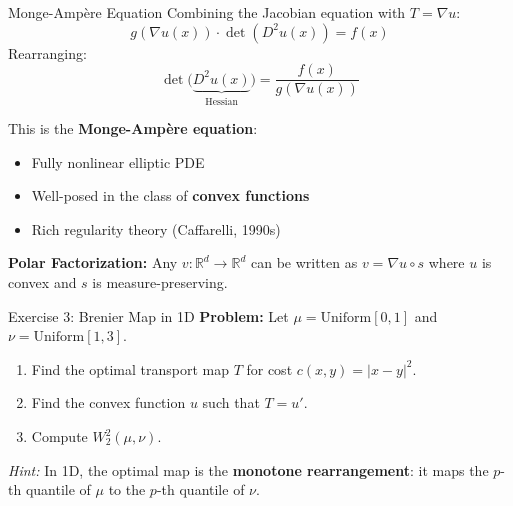 \documentclass[aspectratio=169]{beamer}
\newcommand{\R}{\mathbb{R}}
\begin{document}
\begin{frame}{Monge-Amp\`ere Equation}
Combining the Jacobian equation with $T = \nabla u$:
\[
g(\nabla u(x)) \cdot \det(D^2 u(x)) = f(x)
\]
Rearranging:
\[
\det\bigl(\underbrace{D^2 u(x)}_{\text{Hessian}}\bigr) = \frac{f(x)}{g(\nabla u(x))}
\]

\vspace{0.3cm}
This is the \textbf{Monge-Amp\`ere equation}:
\begin{itemize}
    \item Fully nonlinear elliptic PDE
    \item Well-posed in the class of \textbf{convex functions}
    \item Rich regularity theory (Caffarelli, 1990s)
\end{itemize}

\vspace{0.3cm}
\textbf{Polar Factorization:} Any $v: \R^d \to \R^d$ can be written as $v = \nabla u \circ s$ where $u$ is convex and $s$ is measure-preserving.
\end{frame}

\begin{frame}{Exercise 3: Brenier Map in 1D}
\textbf{Problem:} Let $\mu = \text{Uniform}[0,1]$ and $\nu = \text{Uniform}[1,3]$.

\vspace{0.3cm}
\begin{enumerate}
    \item[(a)] Find the optimal transport map $T$ for cost $c(x,y) = |x-y|^2$.
    \item[(b)] Find the convex function $u$ such that $T = u'$.
    \item[(c)] Compute $W_2^2(\mu,\nu)$.
\end{enumerate}

\vspace{0.5cm}
\textit{Hint:} In 1D, the optimal map is the \textbf{monotone rearrangement}: it maps the $p$-th quantile of $\mu$ to the $p$-th quantile of $\nu$.
\end{frame}
\end{document}
